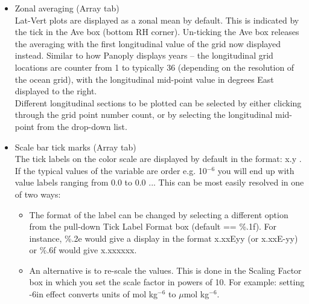 \documentclass[11pt,fleqn]{book} %
\begin{document}
\begin{itemize}
\vspace{1mm}
\item Zonal averaging (\footnotesize\textsf{Array }\normalsize tab)
        \\ \footnotesize\textsf{Lat-Vert }\normalsize plots are displayed as a zonal mean by default. This is indicated by the tick in the \footnotesize\textsf{Ave }\normalsize box (bottom RH corner). Un-ticking the \footnotesize\textsf{Ave }\normalsize box releases the averaging with the first longitudinal value of the grid now displayed instead. Similar to how Panoply displays years -- the longitudinal grid locations are counter from 1 to typically 36 (depending on the resolution of the ocean grid), with the longitudinal mid-point value in degrees East displayed to the right.
        \\ Different longitudinal sections to be plotted can be selected by either clicking through the grid point number count, or by selecting the longitudinal mid-point from the drop-down list.

\vspace{1mm}
\item Scale bar tick marks (\footnotesize\textsf{Array }\normalsize tab)
        \\ The tick labels on the color scale are displayed by default in the format: \footnotesize\textsf{x.y }\normalsize. If the typical values of the variable are order e.g. 10\begin{math}^{-6}\end{math} you will end up with value labels ranging from \footnotesize\textsf{0.0 }\normalsize to \footnotesize\textsf{0.0 }\normalsize ... This can be most easily resolved in one of two ways:
        \begin{itemize}
\item The format of the label can be changed by selecting a different option from the pull-down \footnotesize\textsf{Tick Label Format }\normalsize box (default == \footnotesize\textsf{\%.1f}\normalsize). For instance, \footnotesize\textsf{\%.2e }\normalsize would give a display in the format \footnotesize\textsf{x.xxEyy }\normalsize (or \footnotesize\textsf{x.xxE-yy}\normalsize) or \footnotesize\textsf{\%.6f }\normalsize would give \footnotesize\textsf{x.xxxxxx}\normalsize.
\item An alternative is to re-scale the values. This is done in the Scaling Factor box in which you set the scale factor in powers of 10. For example: setting \footnotesize\textsf{-6}\normalsize in effect converts units of mol kg\begin{math}^{-6}\end{math} to \begin{math}\mu\end{math}mol kg\begin{math}^{-6}\end{math}.
\end{itemize}


\end{itemize}
\end{document}
